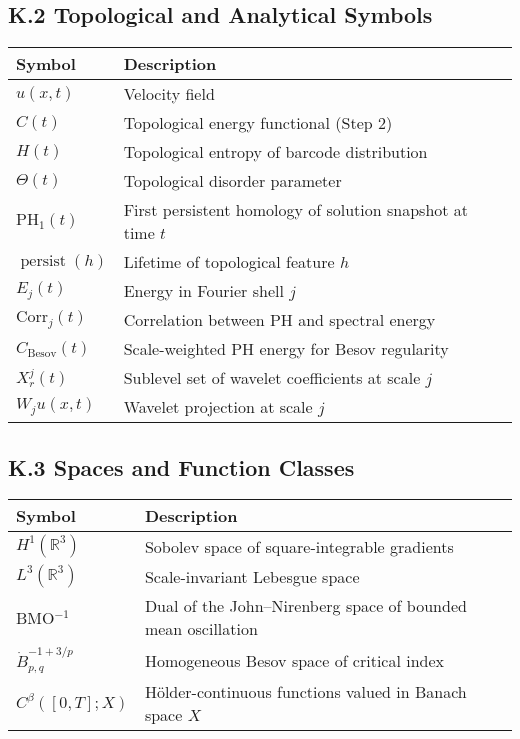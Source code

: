 \documentclass[11pt]{article}
\theoremstyle{definition}
\begin{document}
\subsection*{K.2 Topological and Analytical Symbols}
\begin{tabular}{ll}
\textbf{Symbol} & \textbf{Description} \\
\hline
$u(x,t)$ & Velocity field \\
$C(t)$ & Topological energy functional (Step 2) \\
$H(t)$ & Topological entropy of barcode distribution \\
$\Theta(t)$ & Topological disorder parameter \\
$\mathrm{PH}_1(t)$ & First persistent homology of solution snapshot at time $t$ \\
$\operatorname{persist}(h)$ & Lifetime of topological feature $h$ \\
$E_j(t)$ & Energy in Fourier shell $j$ \\
$\mathrm{Corr}_j(t)$ & Correlation between PH and spectral energy \\
$C_{\mathrm{Besov}}(t)$ & Scale-weighted PH energy for Besov regularity \\
$X^j_r(t)$ & Sublevel set of wavelet coefficients at scale $j$ \\
$W_j u(x,t)$ & Wavelet projection at scale $j$ \\
\end{tabular}

\subsection*{K.3 Spaces and Function Classes}
\begin{tabular}{ll}
\textbf{Symbol} & \textbf{Description} \\
\hline
$H^1(\mathbb{R}^3)$ & Sobolev space of square-integrable gradients \\
$L^3(\mathbb{R}^3)$ & Scale-invariant Lebesgue space \\
BMO$^{-1}$ & Dual of the John--Nirenberg space of bounded mean oscillation \\
$\dot{B}^{-1+3/p}_{p,q}$ & Homogeneous Besov space of critical index \\
$C^\beta([0,T];X)$ & Hölder-continuous functions valued in Banach space $X$ \\
\end{tabular}
\end{document}
